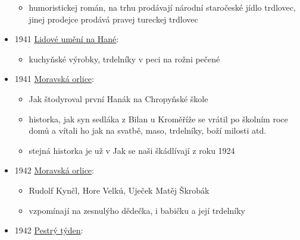 \begin{itemize}
  \begin{itemize}
  \tightlist
  \item
    humoristickej román, na trhu prodávají národní staročeské jídlo
    trdlovec, jinej prodejce prodává pravej tureckej trdlovec
  \end{itemize}
\item
  1941
  \href{https://ceskadigitalniknihovna.cz/view/uuid:3d76f2a0-2cf6-11e4-8e0d-005056827e51?page=uuid\%3A4ffb7cf0-4b61-11e4-aded-005056827e51&fulltext=trdeln\%C3\%ADk\%20OR\%20trdeln\%C3\%ADky\%20OR\%20trdeln\%C3\%ADk\%C5\%AF&source=nkp}{Lidové
  umění na Hané}:

  \begin{itemize}
  \tightlist
  \item
    kuchyňské výrobky, trdelníky v peci na rožni pečené
  \end{itemize}
\item
  1941
  \href{https://ceskadigitalniknihovna.cz/view/uuid:196e9f80-fea6-11de-bd64-000d606f5dc6?page=uuid:30a645e0-fac8-11de-b0ad-000d606f5dc6&fulltext=trdeln\%C3\%AD*&source=mzk}{Moravská
  orlice}:

  \begin{itemize}
  \tightlist
  \item
    Jak štodyroval první Hanák na Chropyňské škole
  \item
    historka, jak syn sedláka z Bilan u Kroměříže se vrátil po školním
    roce domů a vítali ho jak na svatbě, maso, trdelníky, boží milosti
    atd.
  \item
    stejná historka je už v Jak se naši škádlívají z roku 1924
  \end{itemize}
\item
  1942
  \href{https://ceskadigitalniknihovna.cz/view/uuid:a493cef0-fea6-11de-81a7-000d606f5dc6?page=uuid:30eaf000-fac8-11de-9bea-000d606f5dc6&fulltext=trdeln\%C3\%AD*&source=mzk}{Moravská
  orlice}:

  \begin{itemize}
  \tightlist
  \item
    Rudolf Kynčl, Hore Velkú, Uječek Matěj Škrobák
  \item
    vzpomínají na zesnulýho dědečka, i babičku a její trdelníky
  \end{itemize}
\item
  1942
  \href{https://ceskadigitalniknihovna.cz/view/uuid:b2ec6826-435d-11dd-b505-00145e5790ea?page=uuid\%3A5f028ec9-435f-11dd-b505-00145e5790ea&fulltext=trdeln\%C3\%ADk\%20OR\%20trdeln\%C3\%ADky\%20OR\%20trdeln\%C3\%ADk\%C5\%AF&source=mzk}{Pestrý
  týden}:


\end{itemize}
